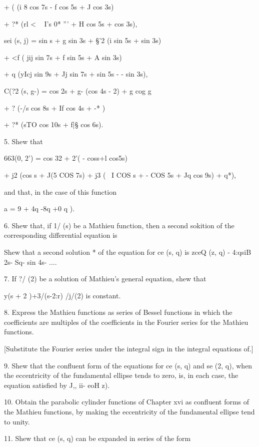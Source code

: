 {{+ ( (i 8 cos 7s - f cos 5s + J cos 3s)

+ ?* (rl < ~ I's 0* ''' + H cos 5s + cos 3s),

sei (s, j) = sin s + g sin 3s + §'2 (i sin 5s + sin 3s)

+ <f ( jij sin 7s + f sin 5s + A sin 3s)

+ q (yIcj sin 9s + Jj sin 7s + sin 5s - - sin 3s),

C(?2 (s, g-) = cos 2s + g- (cos 4s - 2) + g cog g

+ ? (-/s cos 8s + If cos 4s + -* )

+ ?* (sTO cos 10s + f|§ cos 6s).


5. Shew that

663(0, 2') = cos 32 + 2'( - coss+l cos5s)

+ j2 (cos s + J(5 COS 7s) + j3 ( \ I COS s + - COS 5s + Jq cos 9s) +
q*),

and that, in the case of this function

a = 9 + 4q -8q +0 q ).


6. Shew that, if 1/ (s) be a Mathieu function, then a second sokition
of the corresponding differential equation is

Shew that a second solution * of the equation for ce (s, q) is zceQ
(z, q) - 4:qsiB 2s- Sq- sin 4s- ....

7. If ?/ (2) be a solution of Mathieu's general equation, shew that

 y(s + 2 )+3/(s-2:r) /j/(2) is constant.

8. Express the Mathieu functions as series of Bessel functions in
which the coefficients are multiples of the coefficients in the
Fourier series for the Mathieu functions.

[Substitute the Fourier series under the integral sign in the integral
equations of.]

9. Shew that the confluent form of the equations for ce (s, q) and se
(2, q), when the eccentricity of the fundamental ellipse tends to
zero, is, in each case, the equation satisfied by J,, ii- eoH z).

10. Obtain the parabolic cylinder functions of Chapter xvi as
confluent forms of the Mathieu functions, by making the eccentricity
of the fundamental ellipse tend to unity.

11. Shew that ce (s, q) can be expanded in series of the form

}}
